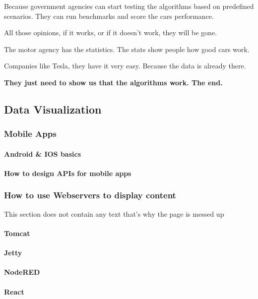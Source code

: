\documentclass[12pt]{scrartcl} %
\begin{document}
Because government agencies can start testing the algorithms based on predefined scenarios. They can run benchmarks and score the cars performance.

All those opinions, if it works, or if it doesn’t work, they will be gone.

The motor agency has the statistics. The stats show people how good cars work.

Companies like Tesla, they have it very easy. Because the data is already there.

\textbf{They just need to show us that the algorithms work. The end.}


\subsection{Data Visualization}

\subsubsection{Mobile Apps}

\paragraph{Android \& IOS basics}
\paragraph{How to design APIs for mobile apps}
 
\subsubsection{How to use Webservers to display content}
This section does not contain any text that's why the page is messed up
\paragraph{Tomcat}
\paragraph{Jetty}
\paragraph{NodeRED}
\paragraph{React}
 
\end{document}
